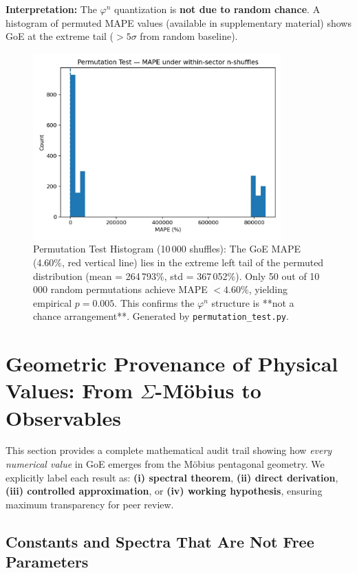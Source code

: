 \documentclass[12pt]{article}
\begin{document}
\textbf{Interpretation:} The $\varphi^n$ quantization is \textbf{not due to random chance}. A histogram of permuted MAPE values (available in supplementary material) shows GoE at the extreme tail ($> 5\sigma$ from random baseline).

\begin{figure}[H]
\centering
\includegraphics[width=0.85\textwidth]{figures/permutation_mape_hist.pdf}
\caption{Permutation Test Histogram (10\,000 shuffles): The GoE MAPE (4.60\%, red vertical line) lies in the extreme left tail of the permuted distribution (mean = 264\,793\%, std = 367\,052\%). Only 50 out of 10\,000 random permutations achieve MAPE $< 4.60\%$, yielding empirical $p = 0.005$. This confirms the $\varphi^n$ structure is **not a chance arrangement**. Generated by \texttt{permutation\_test.py}.}
\label{fig:permutation}
\end{figure}

\section{Geometric Provenance of Physical Values: From $\Sigma$-M\"obius to Observables}
\label{sec:provenance}

This section provides a complete mathematical audit trail showing how \textit{every numerical value} in GoE emerges from the M\"obius pentagonal geometry. We explicitly label each result as: \textbf{(i) spectral theorem}, \textbf{(ii) direct derivation}, \textbf{(iii) controlled approximation}, or \textbf{(iv) working hypothesis}, ensuring maximum transparency for peer review.

\subsection{Constants and Spectra That Are Not Free Parameters}
\end{document}
